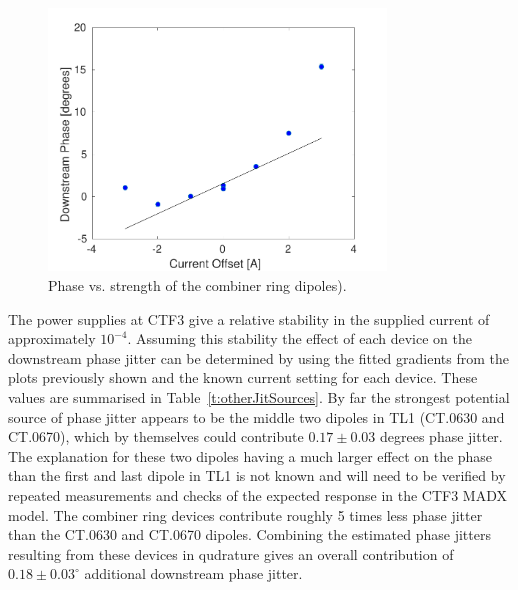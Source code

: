 \begin{figure}
  \centering
  \includegraphics[width=0.8\textwidth]{Figures/propagation/crBends}
  \caption{Phase vs. strength of the combiner ring dipoles).}
  \label{f:crBends}
\end{figure}

The power supplies at CTF3 give a relative stability in the supplied current of approximately \(10^{-4}\). Assuming this stability the effect of each device on the downstream phase jitter can be determined by using the fitted gradients from the plots previously shown and the known current setting for each device. These values are summarised in Table~\ref{t:otherJitSources}. By far the strongest potential source of phase jitter appears to be the middle two dipoles in TL1 (CT.0630 and CT.0670), which by themselves could contribute \(0.17\pm0.03\) degrees phase jitter. The explanation for these two dipoles having a much larger effect on the phase than the first and last dipole in TL1 is not known and will need to be verified by repeated measurements and checks of the expected response in the CTF3 MADX model. The combiner ring devices contribute roughly 5 times less phase jitter than the CT.0630 and CT.0670 dipoles. Combining the estimated phase jitters resulting from these devices in qudrature gives an overall contribution of \(0.18\pm0.03^\circ\) additional downstream phase jitter.


